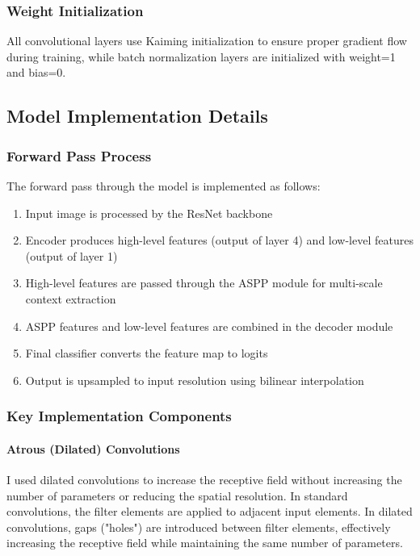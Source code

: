 \documentclass[]{article}
\begin{document}
\subsubsection{Weight Initialization}
All convolutional layers use Kaiming initialization to ensure proper gradient flow during training, while batch normalization layers are initialized with weight=1 and bias=0.

\subsection{Model Implementation Details}

\subsubsection{Forward Pass Process}
The forward pass through the model is implemented as follows:
\begin{enumerate}
    \item Input image is processed by the ResNet backbone
    \item Encoder produces high-level features (output of layer 4) and low-level features (output of layer 1)
    \item High-level features are passed through the ASPP module for multi-scale context extraction
    \item ASPP features and low-level features are combined in the decoder module
    \item Final classifier converts the feature map to logits
    \item Output is upsampled to input resolution using bilinear interpolation
\end{enumerate}

\subsubsection{Key Implementation Components}

\paragraph{Atrous (Dilated) Convolutions}
I used dilated convolutions to increase the receptive field without increasing the number of parameters or reducing the spatial resolution. In standard convolutions, the filter elements are applied to adjacent input elements. In dilated convolutions, gaps ("holes") are introduced between filter elements, effectively increasing the receptive field while maintaining the same number of parameters.
\end{document}

